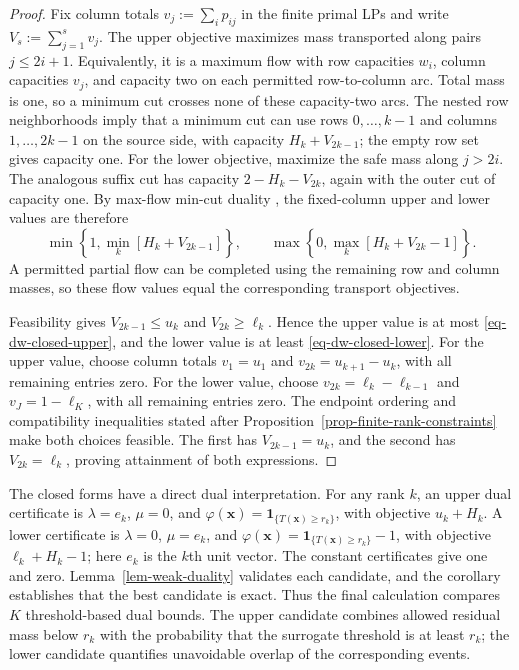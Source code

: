 \begin{proof}
  Fix column totals $v_j:=\sum_i p_{ij}$ in the finite primal LPs and write $V_s:=\sum_{j=1}^s v_j$. The upper objective maximizes mass transported along pairs $j\le2i+1$. Equivalently, it is a maximum flow with row capacities $w_i$, column capacities $v_j$, and capacity two on each permitted row-to-column arc. Total mass is one, so a minimum cut crosses none of these capacity-two arcs. The nested row neighborhoods imply that a minimum cut can use rows $0,\ldots,k-1$ and columns $1,\ldots,2k-1$ on the source side, with capacity $H_k+V_{2k-1}$; the empty row set gives capacity one. For the lower objective, maximize the safe mass along $j>2i$. The analogous suffix cut has capacity $2-H_k-V_{2k}$, again with the outer cut of capacity one. By max-flow min-cut duality \citep{F.F56}, the fixed-column upper and lower values are therefore
  \[
    \min\left\{1,\min_k\left[H_k+V_{2k-1}\right]\right\},\qquad
    \max\left\{0,\max_k\left[H_k+V_{2k}-1\right]\right\}.
  \]
  A permitted partial flow can be completed using the remaining row and column masses, so these flow values equal the corresponding transport objectives.

  Feasibility gives $V_{2k-1}\le u_k$ and $V_{2k}\ge\ell_k$. Hence the upper value is at most \eqref{eq-dw-closed-upper}, and the lower value is at least \eqref{eq-dw-closed-lower}. For the upper value, choose column totals $v_1=u_1$ and $v_{2k}=u_{k+1}-u_k$, with all remaining entries zero. For the lower value, choose $v_{2k}=\ell_k-\ell_{k-1}$ and $v_J=1-\ell_K$, with all remaining entries zero. The endpoint ordering and compatibility inequalities stated after Proposition~\ref{prop-finite-rank-constraints} make both choices feasible. The first has $V_{2k-1}=u_k$, and the second has $V_{2k}=\ell_k$, proving attainment of both expressions.
\end{proof}

The closed forms have a direct dual interpretation. For any rank $k$, an upper dual certificate is $\lambda=e_k$, $\mu=0$, and $\varphi(\bm x)=\mathbf1_{\{T(\bm x)\ge r_k\}}$, with objective $u_k+H_k$. A lower certificate is $\lambda=0$, $\mu=e_k$, and $\varphi(\bm x)=\mathbf1_{\{T(\bm x)\ge r_k\}}-1$, with objective $\ell_k+H_k-1$; here $e_k$ is the $k$th unit vector. The constant certificates give one and zero. Lemma~\ref{lem-weak-duality} validates each candidate, and the corollary establishes that the best candidate is exact. Thus the final calculation compares $K$ threshold-based dual bounds. The upper candidate combines allowed residual mass below $r_k$ with the probability that the surrogate threshold is at least $r_k$; the lower candidate quantifies unavoidable overlap of the corresponding events.

